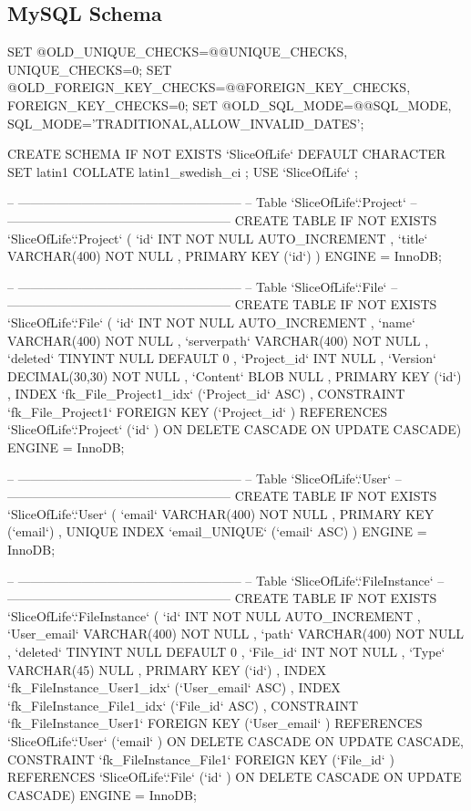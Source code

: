 \subsection{MySQL Schema}
\begin{spverbatim}
SET @OLD_UNIQUE_CHECKS=@@UNIQUE_CHECKS, UNIQUE_CHECKS=0;
SET @OLD_FOREIGN_KEY_CHECKS=@@FOREIGN_KEY_CHECKS, FOREIGN_KEY_CHECKS=0;
SET @OLD_SQL_MODE=@@SQL_MODE, SQL_MODE='TRADITIONAL,ALLOW_INVALID_DATES';

CREATE SCHEMA IF NOT EXISTS `SliceOfLife` DEFAULT CHARACTER SET latin1 COLLATE latin1_swedish_ci ;
USE `SliceOfLife` ;

-- -----------------------------------------------------
-- Table `SliceOfLife`.`Project`
-- -----------------------------------------------------
CREATE  TABLE IF NOT EXISTS `SliceOfLife`.`Project` (
  `id` INT NOT NULL AUTO_INCREMENT ,
  `title` VARCHAR(400) NOT NULL ,
  PRIMARY KEY (`id`) )
ENGINE = InnoDB;


-- -----------------------------------------------------
-- Table `SliceOfLife`.`File`
-- -----------------------------------------------------
CREATE  TABLE IF NOT EXISTS `SliceOfLife`.`File` (
  `id` INT NOT NULL AUTO_INCREMENT ,
  `name` VARCHAR(400) NOT NULL ,
  `serverpath` VARCHAR(400) NOT NULL ,
  `deleted` TINYINT NULL DEFAULT 0 ,
  `Project_id` INT NULL ,
  `Version` DECIMAL(30,30) NOT NULL ,
  `Content` BLOB NULL ,
  PRIMARY KEY (`id`) ,
  INDEX `fk_File_Project1_idx` (`Project_id` ASC) ,
  CONSTRAINT `fk_File_Project1`
    FOREIGN KEY (`Project_id` )
    REFERENCES `SliceOfLife`.`Project` (`id` )
    ON DELETE CASCADE
    ON UPDATE CASCADE)
ENGINE = InnoDB;


-- -----------------------------------------------------
-- Table `SliceOfLife`.`User`
-- -----------------------------------------------------
CREATE  TABLE IF NOT EXISTS `SliceOfLife`.`User` (
  `email` VARCHAR(400) NOT NULL ,
  PRIMARY KEY (`email`) ,
  UNIQUE INDEX `email_UNIQUE` (`email` ASC) )
ENGINE = InnoDB;


-- -----------------------------------------------------
-- Table `SliceOfLife`.`FileInstance`
-- -----------------------------------------------------
CREATE  TABLE IF NOT EXISTS `SliceOfLife`.`FileInstance` (
  `id` INT NOT NULL AUTO_INCREMENT ,
  `User_email` VARCHAR(400) NOT NULL ,
  `path` VARCHAR(400) NOT NULL ,
  `deleted` TINYINT NULL DEFAULT 0 ,
  `File_id` INT NOT NULL ,
  `Type` VARCHAR(45) NULL ,
  PRIMARY KEY (`id`) ,
  INDEX `fk_FileInstance_User1_idx` (`User_email` ASC) ,
  INDEX `fk_FileInstance_File1_idx` (`File_id` ASC) ,
  CONSTRAINT `fk_FileInstance_User1`
    FOREIGN KEY (`User_email` )
    REFERENCES `SliceOfLife`.`User` (`email` )
    ON DELETE CASCADE
    ON UPDATE CASCADE,
  CONSTRAINT `fk_FileInstance_File1`
    FOREIGN KEY (`File_id` )
    REFERENCES `SliceOfLife`.`File` (`id` )
    ON DELETE CASCADE
    ON UPDATE CASCADE)
ENGINE = InnoDB;



\end{spverbatim}
